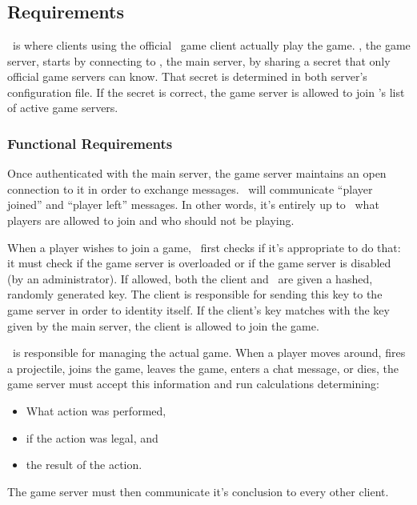 %

\chapter{\GameServer}
\label{gameserver}

\section{Requirements}

\GameServer\ is where clients using the official \VTank\ game client actually play the game. \GameServer, the game server, starts by connecting to \MainServer, the main server, by sharing a secret that only official game servers can know. That secret is determined in both server's configuration file. If the secret is correct, the game server is allowed to join \MainServer's list of active game servers.

\subsection{Functional Requirements}

Once authenticated with the main server, the game server maintains an open connection to it in order to exchange messages. \MainServer\ will communicate ``player joined'' and ``player left'' messages. In other words, it's entirely up to \MainServer\ what players are allowed to join and who should not be playing.

When a player wishes to join a game, \MainServer\ first checks if it's appropriate to do that: it must check if the game server is overloaded or if the game server is disabled (by an administrator). If allowed, both the client and \GameServer\ are given a hashed, randomly generated key. The client is responsible for sending this key to the game server in order to identity itself. If the client's key matches with the key given by the main server, the client is allowed to join the game.

\GameServer\ is responsible for managing the actual game. When a player moves around, fires a projectile, joins the game, leaves the game, enters a chat message, or dies, the game server must accept this information and run calculations determining:
\begin{itemize}
\item What action was performed,
\item if the action was legal, and
\item the result of the action.
\end{itemize}
The game server must then communicate it's conclusion to every other client.

